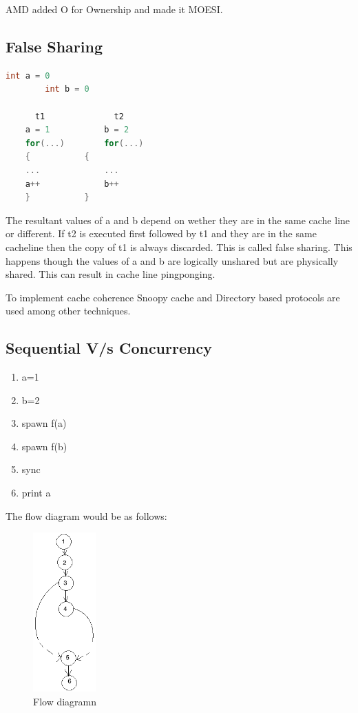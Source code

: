 \documentclass[twoside]{article}
\begin{document}
AMD added O for Ownership and made it MOESI.

\subsection{False Sharing}

\begin{lstlisting}[language=C]
		int a = 0
		int b = 0

   	  t1			  t2
	a = 1			b = 2
	for(...)		for(...)
	{ 			{
	... 			...
	a++ 			b++
	} 			}
\end{lstlisting}


The resultant values of a and b depend on wether they are in the same cache line or different.
If t2 is executed first followed by t1 and they are in the same cacheline then the copy of t1 is always discarded. This is called false sharing. This happens though the values of a and b are logically unshared but are physically shared. This can result in cache line pingponging.

To implement cache coherence Snoopy cache and Directory based protocols are used among other techniques.

\subsection{Sequential V/s Concurrency}


\begin{enumerate}
	\item a=1
	\item b=2
	\item spawn f(a)
	\item spawn f(b)
	\item sync
	\item print a
\end{enumerate}

The flow diagram would be as  follows:

\begin{figure}[ht!]
\centering
\includegraphics[width=24mm]{seq_con.png}
\caption{Flow diagramn \label{Flow diagram}}
\end{figure}
\end{document}
